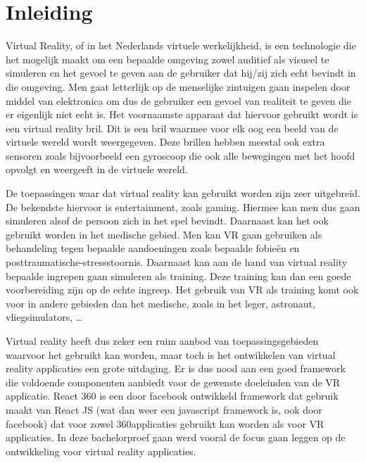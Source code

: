 
\chapter{Inleiding}
\label{ch:inleiding}
Virtual Reality, of in het Nederlands virtuele werkelijkheid, is een technologie die het mogelijk maakt om een bepaalde omgeving zowel auditief als visueel te simuleren en het gevoel te geven aan de gebruiker dat hij/zij zich echt bevindt in die omgeving. Men gaat letterlijk op de menselijke zintuigen gaan inspelen door middel van elektronica om dus de gebruiker een gevoel van realiteit te geven die er eigenlijk niet echt is. Het voornaamste apparaat dat hiervoor gebruikt wordt is een virtual reality bril. Dit is een bril waarmee voor elk oog een beeld van de virtuele wereld wordt weergegeven. Deze brillen hebben meestal ook extra sensoren zoals bijvoorbeeld een gyroscoop die ook alle bewegingen met het hoofd opvolgt en weergeeft in de virtuele wereld.

De toepassingen waar dat virtual reality kan gebruikt worden zijn zeer uitgebreid. De bekendste hiervoor is entertainment, zoals gaming. Hiermee kan men dus gaan simuleren alsof de persoon zich in het spel bevindt. Daarnaast kan het ook gebruikt worden in het medische gebied. Men kan VR gaan gebruiken als behandeling tegen bepaalde aandoeningen zoals bepaalde fobieën en posttraumatische-stressstoornis. Daarnaast kan aan de hand van virtual reality bepaalde ingrepen gaan simuleren als training. Deze training kan dan een goede voorbereiding zijn op de echte ingreep. Het gebruik van VR als training komt ook voor in andere gebieden dan het medische, zoals in het leger, astronaut, vliegsimulators, …

Virtual reality heeft dus zeker een ruim aanbod van toepassingsgebieden waarvoor het gebruikt kan worden, maar toch is het ontwikkelen van virtual reality applicaties een grote uitdaging. Er is dus nood aan een goed framework die voldoende componenten aanbiedt voor de gewenste doeleinden van de VR applicatie. React 360 is een door facebook ontwikkeld framework dat gebruik maakt van React JS (wat dan weer een javascript framework is, ook door facebook) dat voor zowel 360\textdegree applicaties gebruikt kan worden als voor VR applicaties. In deze bachelorproef gaan werd vooral de focus gaan leggen op de ontwikkeling voor virtual reality applicaties.

